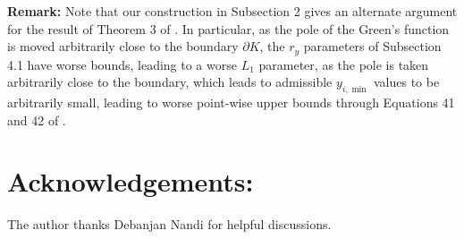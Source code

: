 \documentclass{article}
\theoremstyle{plain}
\theoremstyle{definition}
\theoremstyle{plain}
\begin{document}
\textbf{Remark:} Note that our construction in Subsection 2 gives an alternate argument for the result of Theorem 3 of \cite{Pat25}. In particular, as the pole of the Green's function is moved arbitrarily close to the boundary $\partial K$, the $r_y$ parameters of Subsection 4.1 have worse bounds, leading to a worse $L_1$ parameter, as the pole is taken arbitrarily close to the boundary, which leads to admissible $y_{i,\min}$ values to be arbitrarily small, leading to worse point-wise upper bounds through Equations 41 and 42 of \cite{Pat25}.

\section{Acknowledgements:} The author thanks Debanjan Nandi for helpful discussions.
\end{document}
